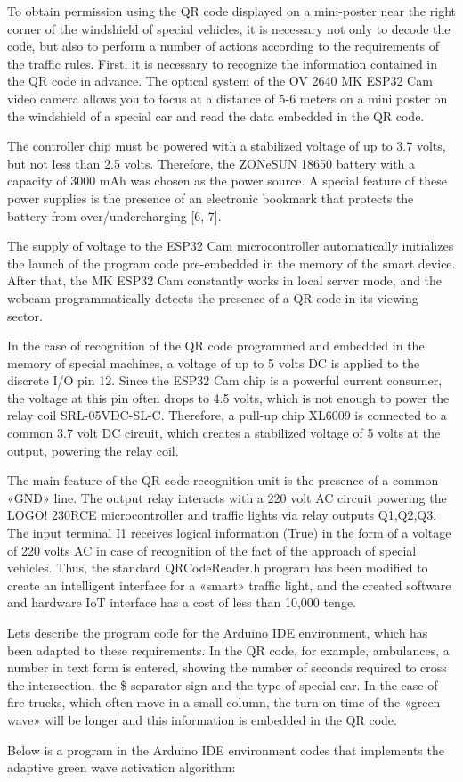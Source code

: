 \begin{multicols}{2}
To obtain permission using the QR code displayed on a mini-poster near
the right corner of the windshield of special vehicles, it is necessary
not only to decode the code, but also to perform a number of actions
according to the requirements of the traffic rules. First, it is
necessary to recognize the information contained in the QR code in
advance. The optical system of the OV 2640 MK ESP32 Cam video camera
allows you to focus at a distance of 5-6 meters on a mini poster on the
windshield of a special car and read the data embedded in the QR code.

The controller chip must be powered with a stabilized voltage of up to
3.7 volts, but not less than 2.5 volts. Therefore, the ZONeSUN 18650
battery with a capacity of 3000 mAh was chosen as the power source. A
special feature of these power supplies is the presence of an electronic
bookmark that protects the battery from over/undercharging {[}6, 7{]}.

The supply of voltage to the ESP32 Cam microcontroller automatically
initializes the launch of the program code pre-embedded in the memory of
the smart device. After that, the MK ESP32 Cam constantly works in local
server mode, and the webcam programmatically detects the presence of a
QR code in its viewing sector.

In the case of recognition of the QR code programmed and embedded in the
memory of special machines, a voltage of up to 5 volts DC is applied to
the discrete I/O pin 12. Since the ESP32 Cam chip is a powerful current
consumer, the voltage at this pin often drops to 4.5 volts, which is not
enough to power the relay coil SRL-05VDC-SL-C. Therefore, a pull-up chip
XL6009 is connected to a common 3.7 volt DC circuit, which creates a
stabilized voltage of 5 volts at the output, powering the relay coil.

The main feature of the QR code recognition unit is the presence of a
common «GND» line. The output relay interacts with a 220 volt AC circuit
powering the LOGO! 230RCE microcontroller and traffic lights via relay
outputs Q1,Q2,Q3. The input terminal I1 receives logical information
(True) in the form of a voltage of 220 volts AC in case of recognition
of the fact of the approach of special vehicles. Thus, the standard
QRCodeReader.h program has been modified to create an intelligent
interface for a «smart» traffic light, and the created software and
hardware IoT interface has a cost of less than 10,000 tenge.

Let\textquotesingle s describe the program code for the Arduino IDE
environment, which has been adapted to these requirements. In the QR
code, for example, ambulances, a number in text form is entered, showing
the number of seconds required to cross the intersection, the \$
separator sign and the type of special car. In the case of fire trucks,
which often move in a small column, the turn-on time of the «green wave»
will be longer and this information is embedded in the QR code.

Below is a program in the Arduino IDE environment codes that implements
the adaptive green wave activation algorithm:
\end{multicols}

